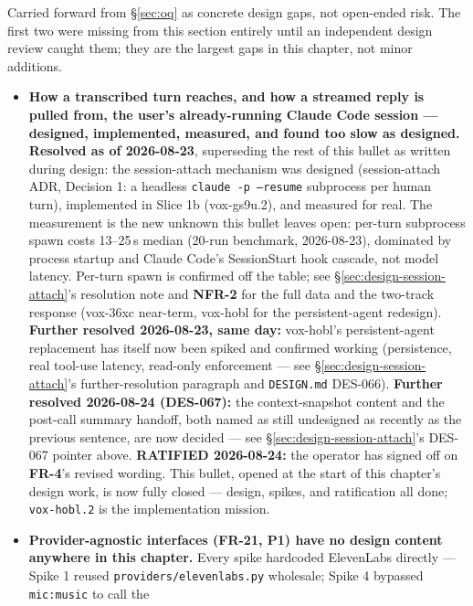 \documentclass[a4paper,11pt]{report}
\newcommand{\fr}[1]{\textbf{FR-#1}}
\newcommand{\nfr}[1]{\textbf{NFR-#1}}
\begin{document}
Carried forward from \S\ref{sec:oq} as concrete design gaps, not
open-ended risk. The first two were missing from this section entirely
until an independent design review caught them; they are the largest
gaps in this chapter, not minor additions.

\begin{itemize}
  \item \textbf{How a transcribed turn reaches, and how a streamed reply
    is pulled from, the user's already-running Claude Code session ---
    designed, implemented, measured, and found too slow as designed.}
    \textbf{Resolved as of 2026-08-23}, superseding the rest of this
    bullet as written during design: the session-attach mechanism was
    designed (session-attach ADR, Decision 1: a headless \texttt{claude -p
    --resume} subprocess per human turn), implemented in Slice 1b
    (vox-gs9u.2), and measured for real. The measurement is the new
    unknown this bullet leaves open: per-turn subprocess spawn costs
    13--25\,s median (20-run benchmark, 2026-08-23), dominated by process
    startup and Claude Code's SessionStart hook cascade, not model
    latency. Per-turn spawn is confirmed off the table; see
    \S\ref{sec:design-session-attach}'s resolution note and \nfr{2} for
    the full data and the two-track response (vox-36xc near-term,
    vox-hobl for the persistent-agent redesign). \textbf{Further resolved
    2026-08-23, same day:} vox-hobl's persistent-agent replacement has
    itself now been spiked and confirmed working (persistence, real
    tool-use latency, read-only enforcement --- see
    \S\ref{sec:design-session-attach}'s further-resolution paragraph and
    \texttt{DESIGN.md} DES-066). \textbf{Further resolved 2026-08-24
    (DES-067):} the context-snapshot content and the post-call summary
    handoff, both named as still undesigned as recently as the previous
    sentence, are now decided --- see
    \S\ref{sec:design-session-attach}'s DES-067 pointer above.
    \textbf{RATIFIED 2026-08-24:} the operator has signed off on \fr{4}'s
    revised wording. This bullet, opened at the start of this chapter's
    design work, is now fully closed --- design, spikes, and ratification
    all done; \texttt{vox-hobl.2} is the implementation mission.
  \item \textbf{Provider-agnostic interfaces (\fr{21}, P1) have no design
    content anywhere in this chapter.} Every spike hardcoded ElevenLabs
    directly --- Spike 1 reused \texttt{providers/elevenlabs.py}
    wholesale; Spike 4 bypassed \texttt{mic:music} to call the

\end{itemize}
\end{document}
